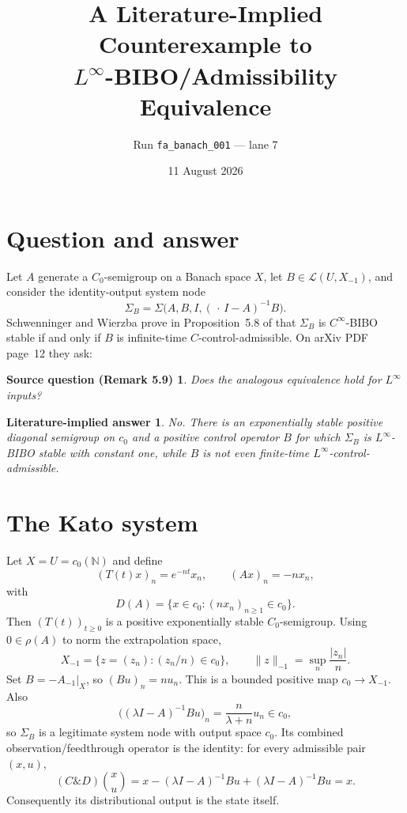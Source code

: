 \documentclass[11pt]{article}
\title{A Literature-Implied Counterexample to\\
$L^\infty$-BIBO/Admissibility Equivalence}
\author{Run \texttt{fa\_banach\_001} --- lane 7}
\date{11 August 2026}
\newtheorem*{sourcequestion}{Source question (Remark 5.9)}
\newtheorem*{answer}{Literature-implied answer}
\newcommand{\N}{\mathbb N}
\newcommand{\Lin}{\mathcal L}
\begin{document}
\maketitle

\begin{center}
\end{center}

\section{Question and answer}

Let $A$ generate a $C_0$-semigroup on a Banach space $X$, let
$B\in\Lin(U,X_{-1})$, and consider the identity-output system node
\[
 \Sigma_B=\Sigma\bigl(A,B,I,(\,\cdot\, I-A)^{-1}B\bigr).
\]
Schwenninger and Wierzba prove in Proposition~5.8 of \cite{source} that
$\Sigma_B$ is $C^\infty$-BIBO stable if and only if $B$ is infinite-time
$C$-control-admissible.  On arXiv PDF page~12 they ask:

\begin{sourcequestion}
Does the analogous equivalence hold for $L^\infty$ inputs?
\end{sourcequestion}

\begin{answer}
No.  There is an exponentially stable positive diagonal semigroup on $c_0$
and a positive control operator $B$ for which $\Sigma_B$ is
$L^\infty$-BIBO stable with constant one, while $B$ is not even finite-time
$L^\infty$-control-admissible.
\end{answer}

\section{The Kato system}

Let $X=U=c_0(\N)$ and define
\[
 (T(t)x)_n=e^{-nt}x_n,\qquad
 (Ax)_n=-n x_n,
\]
with
\[
 D(A)=\{x\in c_0:(n x_n)_{n\ge1}\in c_0\}.
\]
Then $(T(t))_{t\ge0}$ is a positive exponentially stable $C_0$-semigroup.
Using $0\in\rho(A)$ to norm the extrapolation space,
\[
 X_{-1}=\{z=(z_n):(z_n/n)\in c_0\},
 \qquad \|z\|_{-1}=\sup_n\frac{|z_n|}{n}.
\]
Set $B=-A_{-1}|_X$, so $(Bu)_n=n u_n$.  This is a bounded positive map
$c_0\to X_{-1}$.  Also
\[
 \bigl((\lambda I-A)^{-1}Bu\bigr)_n
 =\frac{n}{\lambda+n}u_n\in c_0,
\]
so $\Sigma_B$ is a legitimate system node with output space $c_0$.
Its combined observation/feedthrough operator is the identity: for every
admissible pair $(x,u)$,
\[
 (C\&D)\binom xu
 =x-(\lambda I-A)^{-1}Bu+(\lambda I-A)^{-1}Bu=x.
\]
Consequently its distributional output is the state itself.
\end{document}
